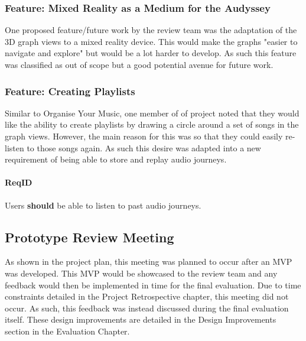 \subsubsection{Feature: Mixed Reality as a Medium for the Audyssey}
One proposed feature/future work by the review team was the adaptation of the 3D graph views to a mixed reality device. This would make the graphs "easier to navigate and explore" but would be a lot harder to develop. As such this feature was classified as out of scope but a good potential avenue for future work.

\subsubsection{Feature: Creating Playlists}
Similar to Organise Your Music, one member of of project noted that they would like the ability to create playlists by drawing a circle around a set of songs in the graph views. However, the main reason for this was so that they could easily re-listen to those songs again. As such this desire was adapted into a new requirement of being able to store and replay audio journeys.%
\paragraph{ReqID} Users \textbf{should} be able to listen to past audio journeys. %

\subsection{Prototype Review Meeting}
As shown in the project plan, this meeting was planned to occur after an MVP was developed. This MVP would be showcased to the review team and any feedback would then be implemented in time for the final evaluation. Due to time constraints detailed in the Project Retrospective chapter, this meeting did not occur. As such, this feedback was instead discussed during the final evaluation itself. These design improvements are detailed in the Design Improvements section in the Evaluation Chapter.

